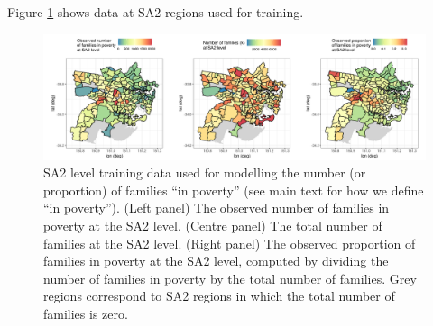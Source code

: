 \documentclass[12pt,a4paper]{article}
\begin{document}
Figure \ref{fig:SA2_level_data} shows data at SA2 regions used for training. 



\begin{figure}[t!]
    \centering
\includegraphics[width = \linewidth]{Images/Sydney_SA2_level_data.png}
    \caption{SA2 level training data used for modelling the number (or proportion) of families ``in poverty'' (see main text for how we define ``in poverty''). (Left panel) The observed number of families in poverty at the SA2 level. (Centre panel) The total number of families at the SA2 level. (Right panel) The observed proportion of families in poverty at the SA2 level, computed by dividing the number of families in poverty by the total number of families. Grey regions correspond to SA2 regions in which the total number of families is zero. 
}   
  \label{fig:SA2_level_data}
\end{figure}
\end{document}
